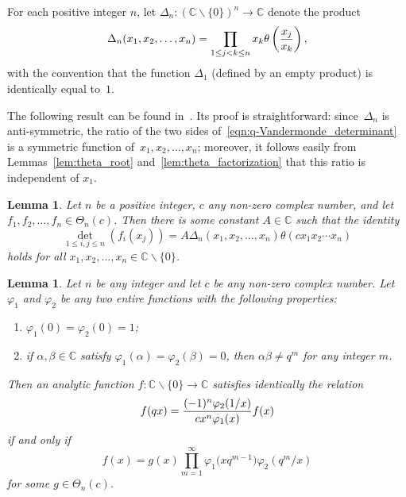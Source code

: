 \documentclass[pdftex]{sigma}
\numberwithin{equation}{section}
\newtheorem{Lemma}[Theorem]{Lemma}
\newcommand{\C}{\mathbb{C}}
\begin{document}
\begin{Definition}
For each positive integer $n$, let $\Delta_n\colon (\C \backslash \{0\})^n \rightarrow \C$ denote the product
\[ \Delta_n(x_1,x_2,\dots,x_n) = \prod_{1 \leq j < k \leq n} x_k \theta\left( {x_j \over x_k} \right), \]
with the convention that the function $\Delta_1$ (defined by an empty product) is identically equal to~$1$.
\end{Definition}

The following result can be found in~\cite[Proposition~3.4]{Rosengren2006}. Its proof is straightforward: since~$\Delta_n$ is anti-symmetric, the ratio of the two sides of~\eqref{eqn:q-Vandermonde_determinant} is a symmetric function of~$x_1, x_2, \allowbreak\dots, x_n$; moreover, it follows easily from Lemmas~\ref{lem:theta_root} and~\ref{lem:theta_factorization} that this ratio is independent of $x_1$.

\begin{Lemma} \label{lem:theta_determinant_lemma}
Let $n$ be a positive integer, $c$ any non-zero complex number, and let $f_1,f_2,\dots,f_n\allowbreak \in \Theta_n(c)$. Then there is some constant $A \in \C$ such that the identity
\begin{equation} \label{eqn:q-Vandermonde_determinant}
\det_{1 \leq i,j \leq n}(f_i(x_j))
= A \Delta_n(x_1,x_2,\dots,x_n) \theta(cx_1x_2 \cdots x_n)
\end{equation}
holds for all $x_1,x_2,\dots,x_n \in \C \backslash\{0\}$.
\end{Lemma}

\begin{Lemma} \label{lem:homogeneous_first-order_q-difference_solution}
Let $n$ be any integer and let $c$ be any non-zero complex number. Let $\varphi_1$ and $\varphi_2$ be any two entire functions with the following properties:
\begin{enumerate}\itemsep=0pt
\item[$(i)$] $\varphi_1(0)=\varphi_2(0)=1$;
\item[$(ii)$] %
if $\alpha,\beta \in \C$ satisfy $\varphi_1(\alpha)=\varphi_2(\beta)=0$, then $\alpha \beta \neq q^m$ for any integer $m$.
\end{enumerate}
Then an analytic function $f\colon\C\backslash\{0\}\rightarrow\C$ satisfies identically the relation
\begin{equation} \label{eqn:homogeneous_first-order_q-difference}
f(qx) = {(-1)^n \varphi_2(1/x) \over cx^n \varphi_1(x)} f(x)
\end{equation}
if and only if
\begin{equation} \label{eqn:homogeneous_first-order_q-difference_solution}
f(x) = g(x) \prod_{m=1}^\infty \varphi_1\bigl(xq^{m-1}\bigr) \varphi_2(q^m/x)
\end{equation}
for some $g \in \Theta_n(c)$.
\end{Lemma}
\end{document}
